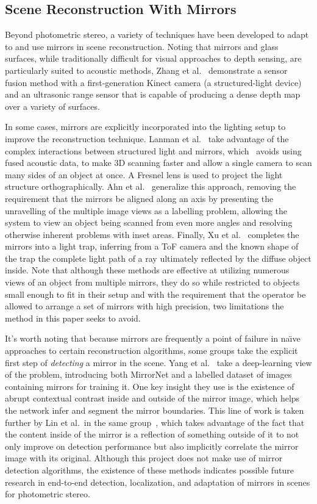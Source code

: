 \subsection{Scene Reconstruction With Mirrors}
Beyond photometric stereo, a variety of techniques have been developed to adapt
to and use mirrors in scene reconstruction. Noting that mirrors and glass
surfaces, while traditionally difficult for visual approaches to depth sensing,
are particularly suited to acoustic methods, Zhang et al.~\cite{zhang}
demonstrate a sensor fusion method with a first-generation Kinect camera (a
structured-light device) and an ultrasonic range sensor that is capable of
producing a dense depth map over a variety of surfaces.

In some cases, mirrors are explicitly incorporated into the lighting setup to
improve the reconstruction technique. Lanman et al.~\cite{lanman} take
advantage of the complex interactions between structured light and mirrors,
which~\cite{zhang} avoids using fused acoustic data, to make 3D scanning faster
and allow a single camera to scan many sides of an object at once. A Fresnel
lens is used to project the light structure orthographically. Ahn et
al.~\cite{ahn} generalize this approach, removing the requirement that the
mirrors be aligned along an axis by presenting the unravelling of the multiple
image views as a labelling problem, allowing the system to view an object being
scanned from even more angles and resolving otherwise inherent problems with
inset areas. Finally, Xu et al.~\cite{xu} completes the mirrors into a light
trap, inferring from a ToF camera and the known shape of the trap the complete
light path of a ray ultimately reflected by the diffuse object inside. Note
that although these methods are effective at utilizing numerous views of an
object from multiple mirrors, they do so while restricted to objects small
enough to fit in their setup and with the requirement that the operator be
allowed to arrange a set of mirrors with high precision, two limitations the
method in this paper seeks to avoid.

It's worth noting that because mirrors are frequently a point of failure in
na\"{\i}ve approaches to certain reconstruction algorithms, some groups take
the explicit first step of \emph{detecting} a mirror in the scene. Yang et
al.~\cite{yang} take a deep-learning view of the problem, introducing both
MirrorNet and a labelled dataset of images containing mirrors for training it.
One key insight they use is the existence of abrupt contextual contrast inside
and outside of the mirror image, which helps the network infer and segment the
mirror boundaries. This line of work is taken further by Lin et al.\ in the
same group~\cite{lin}, which takes advantage of the fact that the content
inside of the mirror is a reflection of something outside of it to not only
improve on detection performance but also implicitly correlate the mirror image
with its original.  Although this project does not make use of mirror detection
algorithms, the existence of these methods indicates possible future research
in end-to-end detection, localization, and adaptation of mirrors in scenes for
photometric stereo.
